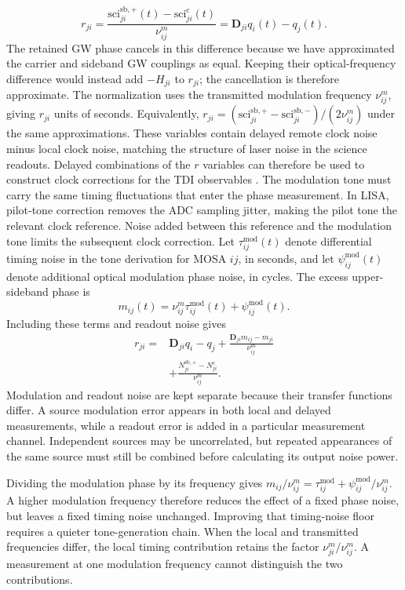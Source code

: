 \begin{equation}\label{correction variables}
    r_{ji} = \frac{\text{sci}^{\mathrm{sb,+}}_{ji}(t)- \text{sci}^{\mathrm{c}}_{ji}(t)}{\nu^m_{ij}}=\mathbf{D}_{ji}q_i(t)-q_j(t).
\end{equation}
The retained GW phase cancels in this difference because we have approximated the carrier and sideband GW couplings as equal. Keeping their optical-frequency difference would instead add $-H_{ji}$ to $r_{ji}$; the cancellation is therefore approximate. The normalization uses the transmitted modulation frequency $\nu^m_{ij}$, giving $r_{ji}$ units of seconds. Equivalently, $r_{ji}=(\text{sci}^{\mathrm{sb,+}}_{ji}-\text{sci}^{\mathrm{sb,-}}_{ji})/(2\nu^m_{ij})$ under the same approximations. These variables contain delayed remote clock noise minus local clock noise, matching the structure of laser noise in the science readouts. Delayed combinations of the $r$ variables can therefore be used to construct clock corrections for the TDI observables \cite{hartwig_clock-jitter_2021}.
The modulation tone must carry the same timing fluctuations that enter the phase measurement. In LISA, pilot-tone correction removes the ADC sampling jitter, making the pilot tone the relevant clock reference. Noise added between this reference and the modulation tone limits the subsequent clock correction. Let $\tau_{ij}^{\mathrm{mod}}(t)$ denote differential timing noise in the tone derivation for MOSA $ij$, in seconds, and let $\psi_{ij}^{\mathrm{mod}}(t)$ denote additional optical modulation phase noise, in cycles. The excess upper-sideband phase is
\begin{equation*}
    m_{ij}(t)=\nu^m_{ij}\tau_{ij}^{\mathrm{mod}}(t)+\psi_{ij}^{\mathrm{mod}}(t).
\end{equation*}
Including these terms and readout noise gives
\begin{align*}
    r_{ji}={}&\mathbf D_{ji}q_i-q_j
    +\frac{\mathbf D_{ji}m_{ij}-m_{ji}}{\nu^m_{ij}}\\
    &+\frac{N^{\mathrm{sb,+}}_{ji}-N^{\mathrm c}_{ji}}{\nu^m_{ij}}.
\end{align*}
Modulation and readout noise are kept separate because their transfer functions differ. A source modulation error appears in both local and delayed measurements, while a readout error is added in a particular measurement channel. Independent sources may be uncorrelated, but repeated appearances of the same source must still be combined before calculating its output noise power.

Dividing the modulation phase by its frequency gives $m_{ij}/\nu^m_{ij}=\tau_{ij}^{\mathrm{mod}}+\psi_{ij}^{\mathrm{mod}}/\nu^m_{ij}$. A higher modulation frequency therefore reduces the effect of a fixed phase noise, but leaves a fixed timing noise unchanged. Improving that timing-noise floor requires a quieter tone-generation chain. When the local and transmitted frequencies differ, the local timing contribution retains the factor $\nu^m_{ji}/\nu^m_{ij}$. A measurement at one modulation frequency cannot distinguish the two contributions.

